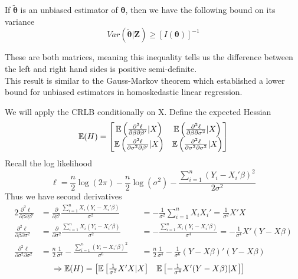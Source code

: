 \documentclass[DIV=14,titlepage=false]{scrreprt}
\begin{document}
\begin{theorem}
    If $\boldsymbol{\tilde{\theta}}$ is an unbiased estimator of $\boldsymbol{\theta}$, then we have the following bound on its variance \[Var(\boldsymbol{\tilde{\theta}|Z})\geq [I(\boldsymbol{\theta})]^{-1}\]
\end{theorem}
These are both matrices, meaning this inequality tells us the difference between the left and right hand sides is positive semi-definite.\\
This result is similar to the Gauss-Markov theorem which established a lower bound for unbiased estimators in homoskedastic linear regression.
\begin{example}
    We will apply the CRLB conditionally on X. Define the expected Hessian 
    \[ \mathbb{E}(H) = 
        \begin{bmatrix}
            \mathbb{E} \left(\frac{\partial^2\ell}{\partial \beta \partial \beta '}|X\right) & \mathbb{E} \left(\frac{\partial^2\ell}{\partial \beta \partial \sigma^2}|X\right)\\
            \mathbb{E} \left(\frac{\partial^2\ell}{\partial \sigma^2 \partial \beta' }|X\right) & \mathbb{E} \left(\frac{\partial^2\ell}{\partial \sigma^2 \partial \sigma^2}|X\right)
        \end{bmatrix}
    \]
    Recall the log likelihood
    \[
        \ell = \frac{n}{2}\log(2\pi) - \frac{n}{2}\log(\sigma^2) - \frac{\sum_{i=1}^{n}(Y_i-X_i'\beta)^2}{2\sigma^2}
    \]
    Thus we have second derivatives
    \begin{alignat*}{2}
        \frac{\partial^2\ell}{\partial \beta \partial \beta '} &= \frac{\partial}{\partial \beta'}\frac{\sum_{i=1}^{n}X_i(Y_i-X_i'\beta)}{\sigma^2} &&= -\frac{1}{\sigma^2} \sum_{i=1}^{n}X_iX_i' = \frac{1}{\sigma^2} X'X\\
        \frac{\partial^2\ell}{\partial \beta \partial \sigma^2} &= \frac{\partial}{\partial \sigma^2}\frac{\sum_{i=1}^{n}X_i(Y_i-X_i'\beta)}{\sigma^2} &&= -\frac{\sum_{i=1}^{n}X_i(Y_i-X_i'\beta)}{\sigma^4} = -\frac{1}{\sigma^4}X'(Y-X\beta)\\
        \frac{\partial^2\ell}{\partial \sigma^2 \partial \sigma^2} &= \frac{n}{2}\frac{1}{\sigma^4} -\frac{\sum_{i=1}^{n}(Y_i-X_i'\beta)^2}{\sigma^6} &&= \frac{n}{2}\frac{1}{\sigma^4} -\frac{1}{\sigma^6}(Y-X\beta)'(Y-X\beta)
    \end{alignat*}
    \begin{align*}
        \Rightarrow \mathbb{E}(H) &= \begin{bmatrix}
            \mathbb{E}\left[\frac{1}{\sigma^2} X'X|X\right] & \mathbb{E}\left[-\frac{1}{\sigma^4}X'(Y-X\beta)|X\right]\\

\end{bmatrix}
\end{align*}
\end{example}
\end{document}
